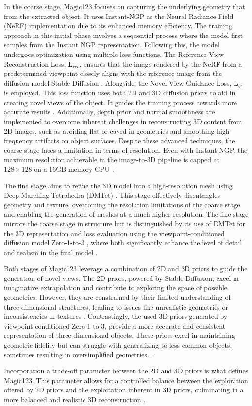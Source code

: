 In the coarse stage, Magic123 focuses on capturing the underlying geometry that from the extracted object. It uses Instant-NGP as the Neural Radiance Field (NeRF) implementation due to its enhanced memory efficiency. The training approach in this initial phase involves a sequential process where the model first samples from the Instant NGP representation. Following this, the model undergoes optimization using multiple loss functions. The Reference View Reconstruction Loss, \(\mathbf{L}_{rec}\), ensures that the image rendered by the NeRF from a predetermined viewpoint closely aligns with the reference image from the diffusion model Stable Diffusion \citep{rombachStableDiffusion}. Alongside, the Novel View Guidance Loss, \(\mathbf{L}_{g}\), is employed. This loss function uses both 2D and 3D diffusion priors to aid in creating novel views of the object. It guides the training process towards more accurate results \citep{qian2023magic123}. Additionally, depth prior and normal smoothness are implemented to overcome inherent challenges in reconstructing 3D content from 2D images, such as avoiding flat or caved-in geometries and smoothing high-frequency artifacts on object surfaces. Despite these advanced techniques, the coarse stage faces a limitation in terms of resolution. Even with Instant-NGP, the maximum resolution achievable in the image-to-3D pipeline is capped at \(128 \times 128\) on a 16GB memory GPU \citep{qian2023magic123}.

The fine stage aims to refine the 3D model into a high-resolution mesh using Deep Marching Tetrahedra (DMTet) \citep{qian2023magic123,shen2021DMTet}. This stage effectively disentangles geometry and texture, overcoming the resolution limitations of the coarse stage and enabling the generation of meshes at a much higher resolution. The fine stage mirrors the coarse stage in structure but is distinguished by its use of DMTet for the 3D representation and loss evaluation using the viewpoint-conditioned diffusion model Zero-1-to-3 \citep{liu2023zero1to3}, where both significantly enhance the level of detail and realism in the final model \citep{qian2023magic123}.

Both stages of Magic123 leverage a combination of 2D and 3D priors to guide the generation of novel views. The 2D priors, powered by Stable Diffusion, excel in imaginative extrapolation and contribute to exploring the space of possible geometries. However, they are constrained by their limited understanding of three-dimensional structures, leading to issues like unrealistic geometries or inconsistencies in textures \citep{qian2023magic123}. Contrastingly, the used 3D priors generated by viewpoint-conditioned Zero-1-to-3, provide a more accurate and consistent representation of three-dimensional objects. These priors excel in maintaining geometric fidelity but can struggle with generalizing to less common objects, sometimes resulting in oversimplified geometries.~\citep{qian2023magic123}.

Incorporation a trade-off parameter between the 2D and 3D priors is what defines Magic123. This parameter allows for a controlled balance between the exploration offered by 2D priors and the exploitation inherent in 3D priors, culminating in a more balanced and realistic 3D reconstruction \citep{qian2023magic123}.
